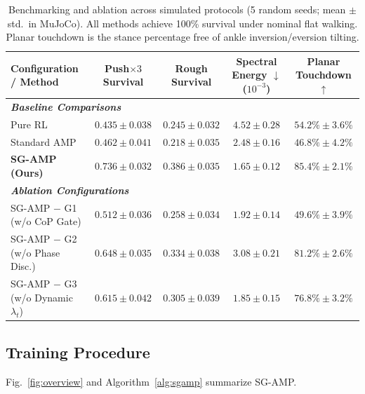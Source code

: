 \documentclass[conference]{IEEEtran}
\begin{document}
\begin{table}[t]
  \centering
  \caption{Benchmarking and ablation across simulated protocols (5 random seeds; mean $\pm$ std.\ in MuJoCo). All methods achieve 100\% survival under nominal flat walking. Planar touchdown is the stance percentage free of ankle inversion/eversion tilting.}
  \label{tab:comparison}
  \small
  \begin{tabular}{lcccc}
    \toprule
    Configuration / Method & Push$\times3$ Survival & Rough Survival & Spectral Energy $\downarrow$ ($10^{-3}$) & Planar Touchdown $\uparrow$ \\
    \midrule
    \multicolumn{5}{l}{\textit{\textbf{Baseline Comparisons}}} \\
    Pure RL & $0.435 \pm 0.038$ & $0.245 \pm 0.032$ & $4.52 \pm 0.28$ & $54.2\% \pm 3.6\%$ \\
    Standard AMP & $0.462 \pm 0.041$ & $0.218 \pm 0.035$ & $2.48 \pm 0.16$ & $46.8\% \pm 4.2\%$ \\
    \textbf{SG-AMP (Ours)} & $\mathbf{0.736 \pm 0.032}$ & $\mathbf{0.386 \pm 0.035}$ & $\mathbf{1.65 \pm 0.12}$ & $\mathbf{85.4\% \pm 2.1\%}$ \\
    \midrule
    \multicolumn{5}{l}{\textit{\textbf{Ablation Configurations}}} \\
    SG-AMP $-$ G1 (w/o CoP Gate) & $0.512 \pm 0.036$ & $0.258 \pm 0.034$ & $1.92 \pm 0.14$ & $49.6\% \pm 3.9\%$ \\
    SG-AMP $-$ G2 (w/o Phase Disc.) & $0.648 \pm 0.035$ & $0.334 \pm 0.038$ & $3.08 \pm 0.21$ & $81.2\% \pm 2.6\%$ \\
    SG-AMP $-$ G3 (w/o Dynamic $\lambda_t$) & $0.615 \pm 0.042$ & $0.305 \pm 0.039$ & $1.85 \pm 0.15$ & $76.8\% \pm 3.2\%$ \\
    \bottomrule
  \end{tabular}
\end{table}

\subsection{Training Procedure}
\label{subsec:method_training}

Fig.~\ref{fig:overview} and Algorithm~\ref{alg:sgamp} summarize SG-AMP.
\end{document}
